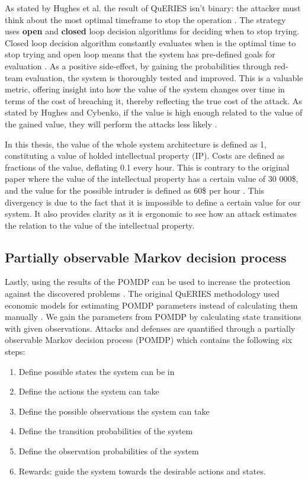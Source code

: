 As stated by Hughes et al. the result of QuERIES isn't binary: the
attacker must think about the most optimal timeframe to stop the
operation \cite{hughes2013quantitative}. The strategy uses
\textbf{open} and \textbf{closed} loop decision algorithms for
deciding when to stop trying. Closed loop decision algorithm
constantly evaluates when is the optimal time to stop trying and open
loop means that the system has pre-defined goals for evaluation
\cite{carin2008cybersecurity}. As a positive side-effect, by gaining
the probabilities through red-team evaluation, the system is
thoroughly tested and improved. This is a valuable metric, offering
insight into how the value of the system changes over time in terms of
the cost of breaching it, thereby reflecting the true cost of the
attack. As stated by Hughes and Cybenko, if the value is high enough
related to the value of the gained value, they will
perform the attacks less likely \cite{hughes2013quantitative}.

In this thesis, the value of the whole system architecture is
defined as 1, constituting a value of holded intellectual
property (IP). Costs are defined as fractions of the value, deflating 
0.1 every hour. This is contrary to the original paper where the
value of the intellectual property has a certain value of 30 000\$, and
the value for the possible intruder is defined as 60\$ per hour
\cite{carin2008cybersecurity}. This divergency is due to the fact
that it is impossible to define a certain value for our system.
It also provides clarity as it is ergonomic to see how an attack
estimates the relation to the value of the intellectual property. 

\subsection{Partially observable Markov decision process}

Lastly, using the results of the POMDP can be used to increase the
protection against the discovered problems
\cite{carin2008cybersecurity}. The original QuERIES methodology used
economic models for estimating POMDP parameters instead of
calculating them manually \cite{carin2008cybersecurity}. We gain the
parameters from POMDP by calculating state transitions with given
observations. Attacks and defenses are quantified through a partially
observable Markov decision process (POMDP) which contains the following six
steps:

\begin{enumerate}
    \item Define possible states the system can be in
    \item Define the actions the system can take
    \item Define the possible observations the system can take
    \item Define the transition probabilities of the system
    \item Define the observation probabilities of the system
    \item Rewards: guide the system towards the desirable actions and
      states.
\end{enumerate} \cite{hughes2013quantitative}


